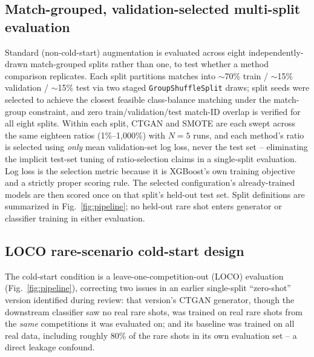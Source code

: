 \documentclass[conference,a4paper]{IEEEtran}
\begin{document}
\subsection{Match-grouped, validation-selected multi-split evaluation}
\label{sec:multisplit}
Standard (non-cold-start) augmentation is evaluated across eight independently-drawn match-grouped splits rather than one, to test whether a method comparison replicates. Each split partitions matches into $\sim$70\% train / $\sim$15\% validation / $\sim$15\% test via two staged \texttt{GroupShuffleSplit} draws; split seeds were selected to achieve the closest feasible class-balance matching under the match-group constraint, and zero train/validation/test match-ID overlap is verified for all eight splits. Within each split, CTGAN and SMOTE are each swept across the same eighteen ratios (1\%--1{,}000\%) with $N=5$ runs, and each method's ratio is selected using \emph{only} mean validation-set log loss, never the test set -- eliminating the implicit test-set tuning of ratio-selection claims in a single-split evaluation. Log loss is the selection metric because it is XGBoost's own training objective and a strictly proper scoring rule. The selected configuration's already-trained models are then scored once on that split's held-out test set. Split definitions are summarized in Fig.~\ref{fig:pipeline}; no held-out rare shot enters generator or classifier training in either evaluation.

\subsection{LOCO rare-scenario cold-start design}
\label{sec:loco}
The cold-start condition is a leave-one-competition-out (LOCO) evaluation (Fig.~\ref{fig:pipeline}), correcting two issues in an earlier single-split ``zero-shot'' version identified during review: that version's CTGAN generator, though the downstream classifier saw no real rare shots, was trained on real rare shots from the \emph{same} competitions it was evaluated on; and its baseline was trained on all real data, including roughly 80\% of the rare shots in its own evaluation set -- a direct leakage confound.
\end{document}
